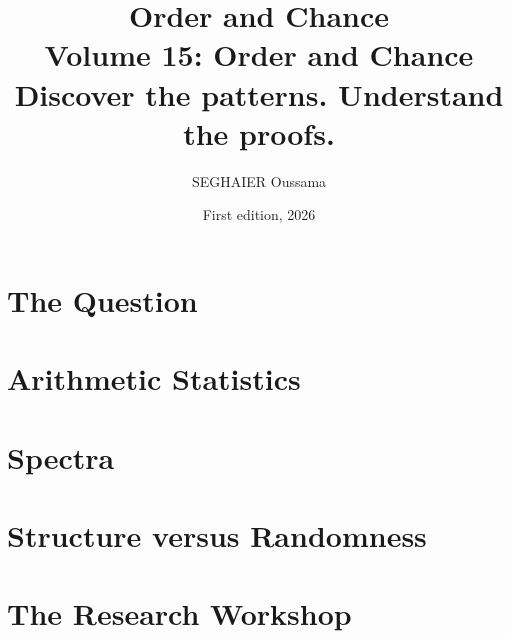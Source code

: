 \documentclass[11pt,openany]{book}
\title{\Huge\textbf{Order and Chance}\\[0.4em]\LARGE Volume 15: Order and Chance\\[0.6em]
\Large Discover the patterns. Understand the proofs.}
\author{SEGHAIER Oussama}
\date{First edition, 2026}
\begin{document}
\frontmatter
\makecover
\maketitle

\tableofcontents

\mainmatter

\part{The Question}




\part{Arithmetic Statistics}






\part{Spectra}




\part{Structure versus Randomness}



\part{The Research Workshop}













\appendix












\end{document}
